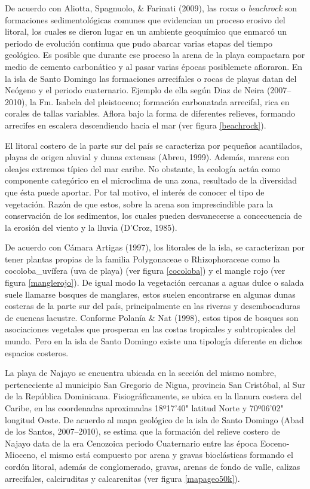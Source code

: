 \documentclass[11pt,]{article}
\begin{document}
De acuerdo con Aliotta, Spagnuolo, \& Farinati (2009), las rocas o
\emph{beachrock} son formaciones sedimentológicas comunes que evidencian
un proceso erosivo del litoral, los cuales se dieron lugar en un
ambiente geoquímico que enmarcó un periodo de evolución continua que
pudo abarcar varias etapas del tiempo geológico. Es posible que durante
ese proceso la arena de la playa compactara por medio de cemento
carbonático y al pasar varias épocas posiblemete afloraron. En la isla
de Santo Domingo las formaciones arrecifales o rocas de playas datan del
Neógeno y el periodo cuaternario. Ejemplo de ella según Diaz de Neira
(2007--2010), la Fm. Isabela del pleistoceno; formación carbonatada
arrecifal, rica en corales de tallas variables. Aflora bajo la forma de
diferentes relieves, formando arrecifes en escalera descendiendo hacia
el mar (ver figura \ref{beachrock}).

El litoral costero de la parte sur del país se caracteriza por pequeños
acantilados, playas de origen aluvial y dunas extensas (Abreu, 1999).
Además, mareas con oleajes extremos típico del mar caribe. No obstante,
la ecología actúa como componente categórico en el microclima de una
zona, resultado de la diversidad que ésta puede aportar. Por tal motivo,
el interés de conocer el tipo de vegetación. Razón de que estos, sobre
la arena son imprescindible para la conservación de los sedimentos, los
cuales pueden desvanecerse a concecuencia de la erosión del viento y la
lluvia (D'Croz, 1985).

De acuerdo con Cámara Artigas (1997), los litorales de la isla, se
caracterizan por tener plantas propias de la familia Polygonaceae o
Rhizophoraceae como la cocoloba\_uvífera (uva de playa) (ver figura
\ref{cocoloba}) y el mangle rojo (ver figura \ref{manglerojo}). De igual
modo la vegetación cercanas a aguas dulce o salada suele llamarse
bosques de manglares, estos suelen encontrarse en algunas dunas costeras
de la parte sur del país, principalmente en las riveras y desembocaduras
de cuencas lacustre. Conforme Polanía \& Nat (1998), estos tipos de
bosques son asociaciones vegetales que prosperan en las costas
tropicales y subtropicales del mundo. Pero en la isla de Santo Domingo
existe una tipología diferente en dichos espacios costeros.

La playa de Najayo se encuentra ubicada en la sección del mismo nombre,
perteneciente al municipio San Gregorio de Nigua, provincia San
Cristóbal, al Sur de la República Dominicana. Fisiográficamente, se
ubica en la llanura costera del Caribe, en las coordenadas aproximadas
18º17'40" latitud Norte y 70º06'02" longitud Oeste. De acuerdo al mapa
geológico de la isla de Santo Domingo (Abad de los Santos, 2007--2010),
se estima que la formación del relieve costero de Najayo data de la era
Cenozoica periodo Cuaternario entre las época Eoceno-Mioceno, el mismo
está compuesto por arena y gravas bioclásticas formando el cordón
litoral, además de conglomerado, gravas, arenas de fondo de valle,
calizas arrecifales, calciruditas y calcarenitas (ver figura
\ref{mapageo50k}).
\end{document}
